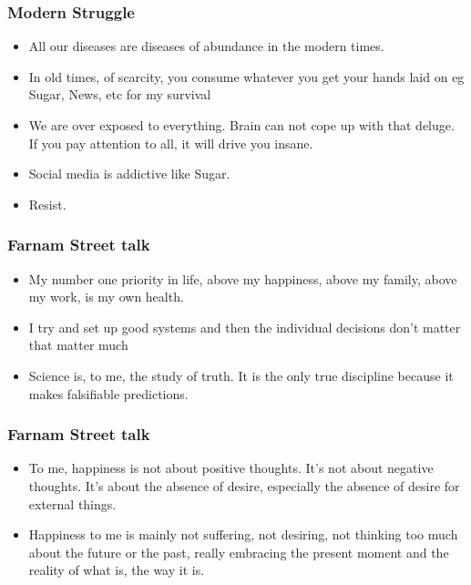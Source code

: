 \begin{frame}[fragile]\frametitle{Modern Struggle}

\begin{itemize}
\item All our diseases are diseases of abundance in the modern times.
\item In old times, of scarcity, you consume whatever you get your hands laid on eg Sugar, News, etc for my survival
\item We are over exposed to everything. Brain can not cope up with that deluge. If you pay attention to all, it will drive you insane. 
\item Social media is addictive like Sugar.
\item Resist. 
\end{itemize}

\end{frame}











\begin{frame}[fragile]\frametitle{Farnam Street talk}

\begin{itemize}
\item My number one priority in life, above my happiness, above my family, above my work, is my own health.
\item I try and set up good systems and then the individual decisions don’t matter that matter much
\item Science is, to me, the study of truth. It is the only true discipline because it makes falsifiable predictions.
\end{itemize}

\end{frame}

\begin{frame}[fragile]\frametitle{Farnam Street talk}

\begin{itemize}
\item To me, happiness is not about positive thoughts. It’s not about negative thoughts. It’s about the absence of desire, especially the absence of desire for external things.
\item Happiness to me is mainly not suffering, not desiring, not thinking too much about the future or the past, really embracing the present moment and
the reality of what is, the way it is.
\end{itemize}

\end{frame}

